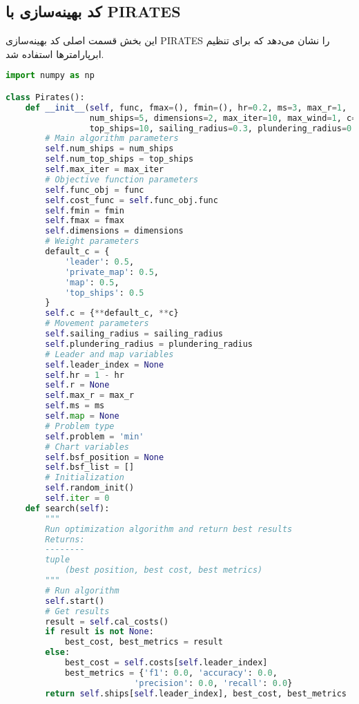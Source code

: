\subsection{کد بهینه‌سازی با PIRATES}
این بخش قسمت اصلی کد بهینه‌سازی PIRATES را نشان می‌دهد که برای تنظیم ابرپارامترها استفاده شد.

\begin{LTR}
\begin{lstlisting}[language=Python, caption={کد بهینه‌سازی با PIRATES}, label={lst:pirates_optimization}, basicstyle=\scriptsize\ttfamily]
import numpy as np

class Pirates():
    def __init__(self, func, fmax=(), fmin=(), hr=0.2, ms=3, max_r=1, 
                 num_ships=5, dimensions=2, max_iter=10, max_wind=1, c={},
                 top_ships=10, sailing_radius=0.3, plundering_radius=0.1):        
        # Main algorithm parameters
        self.num_ships = num_ships
        self.num_top_ships = top_ships
        self.max_iter = max_iter
        # Objective function parameters
        self.func_obj = func
        self.cost_func = self.func_obj.func
        self.fmin = fmin
        self.fmax = fmax
        self.dimensions = dimensions
        # Weight parameters
        default_c = {
            'leader': 0.5,
            'private_map': 0.5,
            'map': 0.5,
            'top_ships': 0.5
        }
        self.c = {**default_c, **c}
        # Movement parameters
        self.sailing_radius = sailing_radius
        self.plundering_radius = plundering_radius
        # Leader and map variables
        self.leader_index = None
        self.hr = 1 - hr
        self.r = None
        self.max_r = max_r
        self.ms = ms
        self.map = None
        # Problem type
        self.problem = 'min'
        # Chart variables
        self.bsf_position = None
        self.bsf_list = []
        # Initialization
        self.random_init()
        self.iter = 0
    def search(self):
        """
        Run optimization algorithm and return best results
        Returns:
        --------
        tuple
            (best position, best cost, best metrics)
        """
        # Run algorithm
        self.start()
        # Get results
        result = self.cal_costs()
        if result is not None:
            best_cost, best_metrics = result
        else:
            best_cost = self.costs[self.leader_index]
            best_metrics = {'f1': 0.0, 'accuracy': 0.0, 
                          'precision': 0.0, 'recall': 0.0}
        return self.ships[self.leader_index], best_cost, best_metrics
\end{lstlisting}
\end{LTR}

